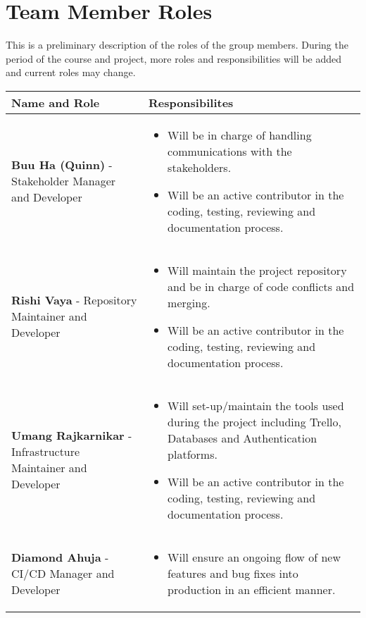 \documentclass{article}
\begin{document}
\section{Team Member Roles}
This is a preliminary description of the roles of the group members. During the period of the course and project, more roles and responsibilities will be added and current roles may change.\\
\setlength{\arrayrulewidth}{0.5mm}
\setlength{\tabcolsep}{18pt}
\renewcommand{\arraystretch}{1.5}
\begin{tabular}{ | m{4cm} | m{8cm} | } 
\hline
  \textbf{Name and Role} & \textbf{Responsibilites} \\ 
  \hline
    \textbf{Buu Ha (Quinn)} - Stakeholder Manager and Developer & \begin{itemize}
	\item Will be in charge of handling communications with the stakeholders.
        \item Will be an active contributor in the coding, testing, reviewing and documentation process.
\end{itemize}\\ 
  \hline
   \textbf{Rishi Vaya} - Repository Maintainer and Developer & \begin{itemize}
	\item Will maintain the project repository and be in charge of code conflicts and merging.
        \item Will be an active contributor in the coding, testing, reviewing and documentation process.
\end{itemize}\\ 
  \hline
    \textbf{Umang Rajkarnikar} - Infrastructure Maintainer and Developer & \begin{itemize}
	\item Will set-up/maintain the tools used during the project including Trello, Databases and Authentication platforms.
        \item Will be an active contributor in the coding, testing, reviewing and documentation process.
\end{itemize}\\ 
  \hline
   \textbf{Diamond Ahuja} - CI/CD Manager and Developer & \begin{itemize}
	\item Will ensure an ongoing flow of new features and bug fixes into production in an efficient manner.

\end{itemize}
\end{tabular}
\end{document}
